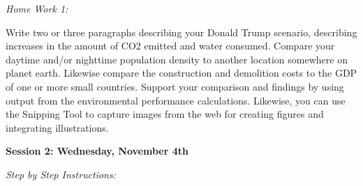 \documentclass{article}
\begin{document}
\begin{enumerate}[leftmargin=15mm]
\vspace{4mm}
\setlength{\leftskip}{0cm}
\textit{Home Work 1:}

Write two or three paragraphs describing your Donald Trump scenario, describing increases in the amount of CO2 emitted and water consumed.  Compare your daytime and/or nighttime population density to another location somewhere on planet earth.  Likewise compare the construction and demolition costs to the GDP of one or more small countries.  Support your comparison and findings by using output from the environmental performance calculations.  Likewise, you can use the Snipping Tool to capture images from the web for creating figures and integrating illustrations.

\end{enumerate}


\setlength{\leftskip}{0cm}

\large{\textbf{Session 2: Wednesday, November 4th}}

\vspace{4mm}
\setlength{\leftskip}{1cm}
\textit{Step by Step Instructions:}
\end{document}
